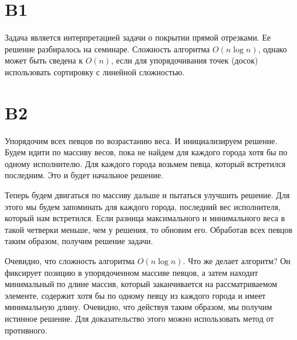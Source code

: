 \documentclass[10pt, oneside, notitlepage]{article}
\begin{document}
\section*{B1}
    Задача является интерпретацией задачи о покрытии прямой отрезками.
    Ее решение разбиралось на семинаре. Сложность алгоритма $O(n \log n)$,
    однако может быть сведена к $O(n)$,
    если для упорядочивания точек (досок) использовать сортировку с линейной сложностью.

\section*{B2}
    Упорядочим всех певцов по возрастанию веса. И инициализируем решение.
    Будем идити по массиву весов, пока не найдем для каждого города хотя бы по одному исполнителю.
    Для каждого города возьмем певца, который встретился последним. Это и будет начальное решение.

    Теперь будем двигаться по массиву дальше и пытаться улучшить решение.
    Для этого мы будем запоминать для каждого города, последний вес исполнителя, который нам встретился.
    Если разница максимального и минимального веса в такой четверки меньше, чем у решения,
    то обновим его. Обработав всех певцов таким образом, получим решение задачи.

    Очевидно, что сложность алгоритма $O(n \log n)$. Что же делает алгоритм?
    Он фиксирует позицию в упорядоченном массиве певцов,
    а затем находит минимальный по длине массив, который заканчивается на рассматриваемом элементе,
    содержит хотя бы по одному певцу из каждого города и имеет минимальную длину.
    Очевидно, что действуя таким образом, мы получим истинное решение.
    Для доказательство этого можно использовать метод от противного.
\end{document}
